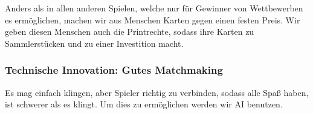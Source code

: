 \documentclass[fontsize=12]{scrartcl}
\begin{document}
	Anders als in allen anderen Spielen, welche nur für Gewinner von Wettbewerben es ermöglichen, machen wir aus Menschen Karten gegen einen festen Preis. Wir geben diesen Menschen auch die Printrechte, sodass ihre Karten zu Sammlerstücken und zu einer Investition macht.
	
	\subsubsection{Technische Innovation: Gutes Matchmaking}
	
	Es mag einfach klingen, aber Spieler richtig zu verbinden, sodass alle Spaß haben, ist schwerer als es klingt. Um dies zu ermöglichen werden wir AI benutzen.
	
	\newpage
	
	
	
\end{document}

